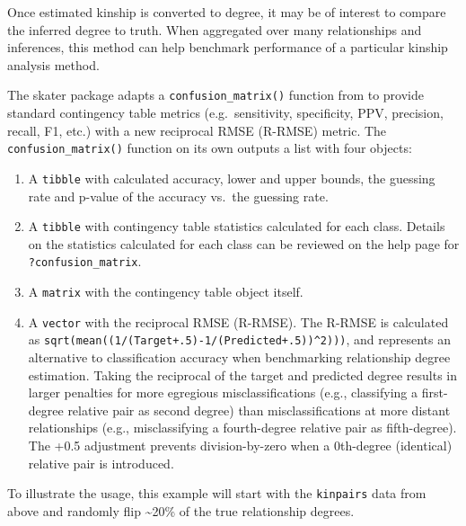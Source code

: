\documentclass[9pt,a4paper,]{extarticle}
\begin{document}
Once estimated kinship is converted to degree, it may be of interest to compare the inferred degree to truth. When aggregated over many relationships and inferences, this method can help benchmark performance of a particular kinship analysis method.

The skater package adapts a \texttt{confusion\_matrix()} function from \citet{clark2021} to provide standard contingency table metrics (e.g.~sensitivity, specificity, PPV, precision, recall, F1, etc.) with a new reciprocal RMSE (R-RMSE) metric. The \texttt{confusion\_matrix()} function on its own outputs a list with four objects:

\begin{enumerate}
\def\labelenumi{\arabic{enumi}.}
\item
  A \texttt{tibble} with calculated accuracy, lower and upper bounds, the guessing rate and p-value of the accuracy vs.~the guessing rate.
\item
  A \texttt{tibble} with contingency table statistics calculated for each class. Details on the statistics calculated for each class can be reviewed on the help page for \texttt{?confusion\_matrix}.
\item
  A \texttt{matrix} with the contingency table object itself.
\item
  A \texttt{vector} with the reciprocal RMSE (R-RMSE). The R-RMSE is calculated as \texttt{sqrt(mean((1/(Target+.5)-1/(Predicted+.5))\^{}2)))}, and represents an alternative to classification accuracy when benchmarking relationship degree estimation. Taking the reciprocal of the target and predicted degree results in larger penalties for more egregious misclassifications (e.g., classifying a first-degree relative pair as second degree) than misclassifications at more distant relationships (e.g., misclassifying a fourth-degree relative pair as fifth-degree). The +0.5 adjustment prevents division-by-zero when a 0th-degree (identical) relative pair is introduced.
\end{enumerate}

To illustrate the usage, this example will start with the \texttt{kinpairs} data from above and randomly flip \textasciitilde20\% of the true relationship degrees.
\end{document}
